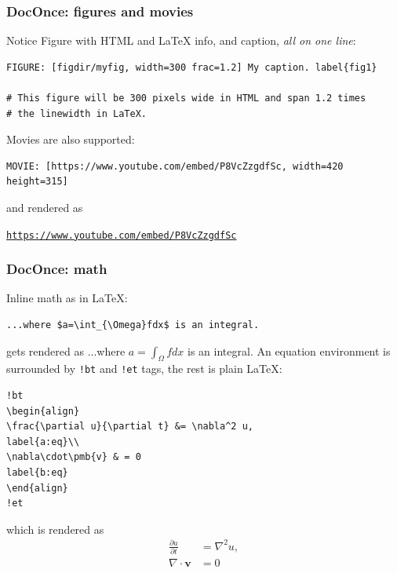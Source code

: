 \documentclass{beamer}
\newenvironment{doconce:movie}{}{}
\newcounter{doconce:movie:counter}
\begin{document}
\begin{frame}
\frametitle{DocOnce: figures and movies}

\begin{block}{Notice}
Figure with HTML and {\LaTeX} info, and caption, \emph{all on one line}:
\end{block}
\begin{Verbatim}[numbers=none,fontsize=\fontsize{9pt}{9pt},baselinestretch=0.95]
FIGURE: [figdir/myfig, width=300 frac=1.2] My caption. label{fig1}

# This figure will be 300 pixels wide in HTML and span 1.2 times
# the linewidth in LaTeX.

\end{Verbatim}

Movies are also supported:
\begin{Verbatim}[numbers=none,fontsize=\fontsize{9pt}{9pt},baselinestretch=0.95]
MOVIE: [https://www.youtube.com/embed/P8VcZzgdfSc, width=420 height=315]

\end{Verbatim}

and rendered as
\begin{doconce:movie}
\begin{center}
\href{{https://www.youtube.com/embed/P8VcZzgdfSc}}{\nolinkurl{https://www.youtube.com/embed/P8VcZzgdfSc}}
\end{center}
\end{doconce:movie}
\end{frame}

\begin{frame}
\frametitle{DocOnce: math}

Inline math as in {\LaTeX}:
\begin{Verbatim}[numbers=none,fontsize=\fontsize{9pt}{9pt},baselinestretch=0.95]
...where $a=\int_{\Omega}fdx$ is an integral.

\end{Verbatim}

gets rendered as ...where $a=\int_{\Omega}fdx$ is an integral.
An equation environment is surrounded by \Verb?!bt? and \Verb?!et? tags,
the rest is plain {\LaTeX}:
\begin{Verbatim}[numbers=none,fontsize=\fontsize{9pt}{9pt},baselinestretch=0.95]
!bt
\begin{align}
\frac{\partial u}{\partial t} &= \nabla^2 u,
label{a:eq}\\
\nabla\cdot\pmb{v} & = 0
label{b:eq}
\end{align}
!et

\end{Verbatim}

which is rendered as
\begin{align}
\frac{\partial u}{\partial t} &= \nabla^2 u,
\label{_a:eq}\\
\nabla\cdot\pmb{v} & = 0
\label{_b:eq}
\end{align}
\end{frame}
\end{document}
